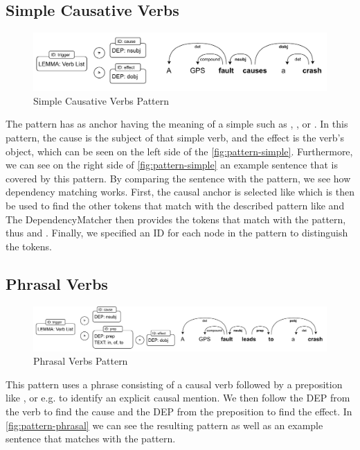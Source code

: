 \subsection{Simple Causative Verbs}\label{subsec:simple-causative-verbs-pattern}
\begin{figure}
    \includegraphics[width=\textwidth]{figures/cause_effect_extraction/simple_pattern}
    \caption{Simple Causative Verbs Pattern}\label{fig:pattern-simple}
\end{figure}
The pattern has as anchor having the meaning of a simple  such as , , or .
In this pattern, the cause is the subject of that simple verb, and the effect is the verb's object, which can be seen on the left side of the \autoref{fig:pattern-simple}.
Furthermore, we can see on the right side of \autoref{fig:pattern-simple} an example sentence that is covered by this pattern.
By comparing the sentence with the pattern, we see how dependency matching works.
First, the causal anchor is selected like  which is then be used to find the other tokens that match with the described pattern like  and 
The DependencyMatcher then provides the tokens that match with the pattern, thus    and .
Finally, we specified an ID for each node in the pattern to distinguish the tokens.

\subsection{Phrasal Verbs}\label{subsec:phrasal-verbs-pattern}
\begin{figure}
    \includegraphics[width=\textwidth]{figures/cause_effect_extraction/phrasal_pattern}
    \caption{Phrasal Verbs Pattern}\label{fig:pattern-phrasal}
\end{figure}
This pattern uses a phrase consisting of a causal verb followed by a preposition like ,  or  e.g.  to identify an explicit causal mention.
We then follow the  \ac{DEP} from the verb to find the cause and the  \ac{DEP} from the preposition to find the effect.
In \autoref{fig:pattern-phrasal} we can see the resulting pattern as well as an example sentence that matches with the pattern.

